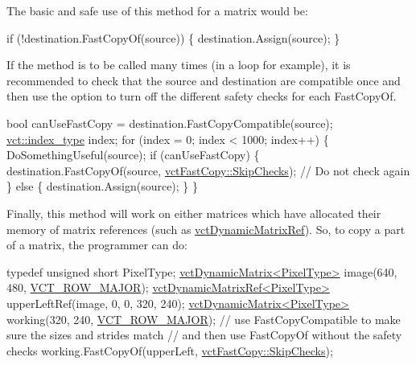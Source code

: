 The basic and safe use of this method for a matrix would be\+: 
\begin{DoxyCode}
\textcolor{keywordflow}{if} (!destination.FastCopyOf(source)) \{
    destination.Assign(source);
\}
\end{DoxyCode}


If the method is to be called many times (in a loop for example), it is recommended to check that the source and destination are compatible once and then use the option to turn off the different safety checks for each Fast\+Copy\+Of. 
\begin{DoxyCode}
\textcolor{keywordtype}{bool} canUseFastCopy = destination.FastCopyCompatible(source);
\hyperlink{namespacevct_a50405d87494dce1f22ee3930ca285ee9}{vct::index\_type} index;
\textcolor{keywordflow}{for} (index = 0; index < 1000; index++) \{
    DoSomethingUseful(source);
    \textcolor{keywordflow}{if} (canUseFastCopy) \{
        destination.FastCopyOf(source, \hyperlink{classvct_fast_copy_a221c1b0117c8dcf51332ad84f4e0fda5}{vctFastCopy::SkipChecks}); \textcolor{comment}{// Do not check
       again}
    \} \textcolor{keywordflow}{else} \{
        destination.Assign(source);
    \}
\}
\end{DoxyCode}


Finally, this method will work on either matrices which have allocated their memory of matrix references (such as \hyperlink{classvct_dynamic_matrix_ref}{vct\+Dynamic\+Matrix\+Ref}). So, to copy a part of a matrix, the programmer can do\+: 
\begin{DoxyCode}
\textcolor{keyword}{typedef} \textcolor{keywordtype}{unsigned} \textcolor{keywordtype}{short} PixelType;
\hyperlink{classvct_dynamic_matrix}{vctDynamicMatrix<PixelType>} image(640, 480, 
      \hyperlink{vct_forward_declarations_8h_a45ba752f741240bf765417ebc8130d62}{VCT\_ROW\_MAJOR});
\hyperlink{classvct_dynamic_matrix_ref}{vctDynamicMatrixRef<PixelType>} upperLeftRef(image, 0, 0, 320, 240);
\hyperlink{classvct_dynamic_matrix}{vctDynamicMatrix<PixelType>} working(320, 240, 
      \hyperlink{vct_forward_declarations_8h_a45ba752f741240bf765417ebc8130d62}{VCT\_ROW\_MAJOR});
\textcolor{comment}{// use FastCopyCompatible to make sure the sizes and strides match}
\textcolor{comment}{// and then use FastCopyOf without the safety checks}
working.FastCopyOf(upperLeft, \hyperlink{classvct_fast_copy_a221c1b0117c8dcf51332ad84f4e0fda5}{vctFastCopy::SkipChecks});
\end{DoxyCode}



